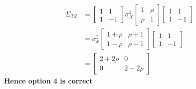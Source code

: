 \documentclass{article}
\begin{document}
\begin{align*}
    \Sigma_{TZ} &= \begin{bmatrix}
   1   &   1\\
   1   &   -1
\end{bmatrix} \sigma_X^2 
\begin{bmatrix}
   1    & \rho \\
   \rho &  1 
\end{bmatrix}
\begin{bmatrix}
   1   &   1\\
   1   &   -1
\end{bmatrix}\\
&= \sigma_x^2 \begin{bmatrix}
    1 + \rho   &   \rho + 1\\
    1 - \rho   &    \rho - 1
\end{bmatrix} 
\begin{bmatrix}
   1   &   1\\
   1   &   -1
\end{bmatrix} \\&=
\begin{bmatrix}
   2+2\rho    &     0\\
   0         &     2-2\rho
\end{bmatrix}
\end{align*}
\textbf{Hence option 4 is correct}
\end{document}
